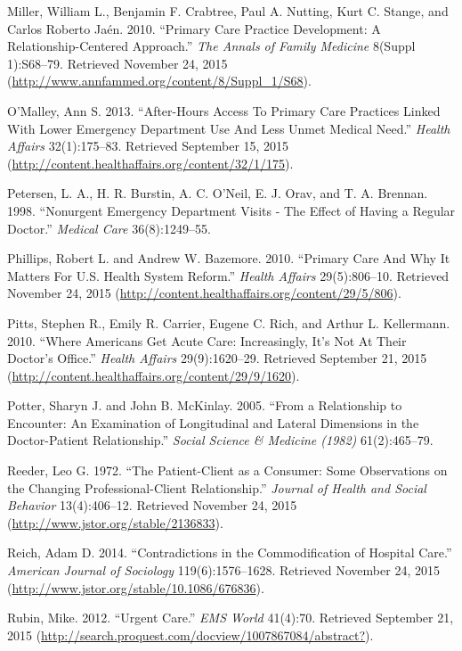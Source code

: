 \documentclass[12pt,twoside]{reedthesis}
\begin{document}
  Miller, William L., Benjamin F. Crabtree, Paul A. Nutting, Kurt C.
  Stange, and Carlos Roberto Ja{é}n. 2010. ``Primary Care Practice
  Development: A Relationship-Centered Approach.'' \emph{The Annals of
  Family Medicine} 8(Suppl 1):S68--79. Retrieved November 24, 2015
  (\url{http://www.annfammed.org/content/8/Suppl_1/S68}).
  
  O'Malley, Ann S. 2013. ``After-Hours Access To Primary Care Practices
  Linked With Lower Emergency Department Use And Less Unmet Medical
  Need.'' \emph{Health Affairs} 32(1):175--83. Retrieved September 15,
  2015 (\url{http://content.healthaffairs.org/content/32/1/175}).
  
  Petersen, L. A., H. R. Burstin, A. C. O'Neil, E. J. Orav, and T. A.
  Brennan. 1998. ``Nonurgent Emergency Department Visits - The Effect of
  Having a Regular Doctor.'' \emph{Medical Care} 36(8):1249--55.
  
  Phillips, Robert L. and Andrew W. Bazemore. 2010. ``Primary Care And Why
  It Matters For U.S. Health System Reform.'' \emph{Health Affairs}
  29(5):806--10. Retrieved November 24, 2015
  (\url{http://content.healthaffairs.org/content/29/5/806}).
  
  Pitts, Stephen R., Emily R. Carrier, Eugene C. Rich, and Arthur L.
  Kellermann. 2010. ``Where Americans Get Acute Care: Increasingly, It's
  Not At Their Doctor's Office.'' \emph{Health Affairs} 29(9):1620--29.
  Retrieved September 21, 2015
  (\url{http://content.healthaffairs.org/content/29/9/1620}).
  
  Potter, Sharyn J. and John B. McKinlay. 2005. ``From a Relationship to
  Encounter: An Examination of Longitudinal and Lateral Dimensions in the
  Doctor-Patient Relationship.'' \emph{Social Science \& Medicine (1982)}
  61(2):465--79.
  
  Reeder, Leo G. 1972. ``The Patient-Client as a Consumer: Some
  Observations on the Changing Professional-Client Relationship.''
  \emph{Journal of Health and Social Behavior} 13(4):406--12. Retrieved
  November 24, 2015 (\url{http://www.jstor.org/stable/2136833}).
  
  Reich, Adam D. 2014. ``Contradictions in the Commodification of Hospital
  Care.'' \emph{American Journal of Sociology} 119(6):1576--1628.
  Retrieved November 24, 2015
  (\url{http://www.jstor.org/stable/10.1086/676836}).
  
  Rubin, Mike. 2012. ``Urgent Care.'' \emph{EMS World} 41(4):70. Retrieved
  September 21, 2015
  (\url{http://search.proquest.com/docview/1007867084/abstract?}).
  
\end{document}
